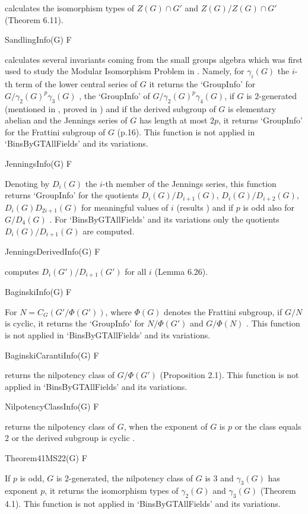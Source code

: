 calculates the isomorphism types of $Z(G) \cap G'$ and $Z(G)/ Z(G) \cap G'$ 
\cite{San85}(Theorem 6.11).

\> SandlingInfo(G) F

calculates several invariants coming from the small groups algebra which was first
used to study the Modular Isomorphism Problem in \cite{San89}. Namely, for $\gamma_i(G)$
the $i$-th term of the lower central series of $G$ it returns the `GroupInfo' for
$G/\gamma_2(G)^p\gamma_3(G)$ \cite{San89}, the `GroupInfo' of $G/\gamma_2(G)^p\gamma_4(G)$,
if $G$ is $2$-generated (mentioned in \cite{Bag99}, proved in \cite{MM22}) and if the
derived subgroup of $G$ is elementary abelian and the Jennings series of $G$ has length
at most $2p$, it returns `GroupInfo' for the Frattini subgroup of $G$ \cite{HS06}(p.16).
This function is not applied in `BinsByGTAllFields' and its variations.

\> JenningsInfo(G) F

Denoting by $D_i(G)$ the $i$-th member of the Jennings series, this function returns   
`GroupInfo' for the quotients $D_i(G)/D_{i+1}(G)$, $D_i(G)/D_{i+2}(G)$, $D_i(G)D_{2i+1}(G)$
for meaningful values of $i$ (results \cite{Jen41} \cite{PS72} \cite{RS83}) and if $p$ is odd also for
$G/D_4(G)$ \cite{Her07}. For `BinsByGTAllFields' and its variations only the quotients
$D_i(G)/D_{i+1}(G)$ are computed.

\> JenningsDerivedInfo(G) F

computes $D_i(G')/D_{i+1}(G')$ for all $i$ \cite{San85}(Lemma 6.26).

\> BaginskiInfo(G) F

For $N = C_G(G'/\Phi(G'))$, where $\Phi(G)$ denotes the Frattini subgroup, if $G/N$ is
cyclic, it returns the `GroupInfo' for $N/\Phi(G')$ and $G/\Phi(N)$ \cite{Bag99}.
This function is not applied in `BinsByGTAllFields' and its variations.

\> BaginskiCarantiInfo(G) F

returns the nilpotency class of $G/\Phi(G')$ \cite{BC88}(Proposition 2.1). 
This function is not applied in `BinsByGTAllFields' and its variations.

\> NilpotencyClassInfo(G) F

returns the nilpotency class of $G$, when the exponent of $G$ is $p$ or the class equals 2
or the derived subgroup is cyclic \cite{BK07}.

\> Theorem41MS22(G) F

If $p$ is odd, $G$ is $2$-generated, the nilpotency class of $G$ is $3$ and $\gamma_3(G)$ 
has exponent $p$, it returns the isomorphism types of $\gamma_2(G)$ and $\gamma_3(G)$
\cite{MS22}(Theorem 4.1). This function is not applied in `BinsByGTAllFields' and its variations.

